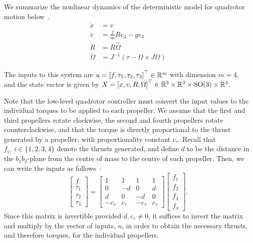We summarize the nonlinear dynamics of the deterministic model for quadrotor motion below~\cite{Mellinger2012}.
\begin{equation}
    \begin{aligned}
        \dot x &= v \\
        \dot v &= \frac{f}{m}Re_3 - ge_3 \\
        \dot R &= R \hat \Omega \\
        \dot \Omega &= J^{-1} (\tau - \Omega \times J\Omega)
    \end{aligned}
\label{quad:full_dyn}
\end{equation}

The inputs to this system are $u={[f, \tau_1, \tau_2, \tau_3]}^\top \in \mathbb{R}^m$ with dimension $m=4$, and the state vector is given by $X = {[x, v, R, \Omega]}^\top \in \mathbb{R}^3 \times \mathbb{R}^3 \times \text{SO}(3) \times \mathbb{R}^3$.

Note that the low-level quadrotor controller must convert the input values to the individual torques to be applied to each propeller. We assume that the first and third propellers rotate clockwise, the second and fourth propellers rotate counterclockwise, and that the torque is directly proportional to the thrust generated by a propeller, with proportionality constant $c_\tau$. Recall that $f_i, \ i \in \{1,2,3,4\}$ denote the thrusts generated, and define $d$ to be the distance in the $b_1b_2$-plane from the centre of mass to the centre of each propeller. Then, we can write the inputs as follows~\cite{Lee2010, Mellinger2012}:
\begin{equation}
    \begin{bmatrix}
        f \\ \tau_1 \\ \tau_2 \\ \tau_3
    \end{bmatrix}
    =
    \begin{bmatrix}
        1       & 1       & 1       & 1   \\
        0       & -d      & 0       & d   \\
        d       & 0       & -d      & 0   \\
        -c_\tau & c_\tau  & -c_\tau & c_\tau
    \end{bmatrix}
    \begin{bmatrix}
        f_1 \\ f_2 \\ f_3 \\ f_4
    \end{bmatrix}.
\label{quad:eqn:invert_this}
\end{equation}
Since this matrix is invertible provided $d, c_\tau \neq 0$, it suffices to invert the matrix and multiply by the vector of inputs, $u$, in order to obtain the necessary thrusts, and therefore torques, for the individual propellers.

